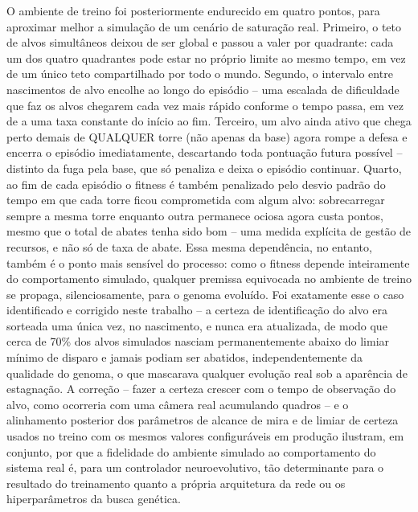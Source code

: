 \documentclass[12pt,a4paper]{article}
\begin{document}
O ambiente de treino foi posteriormente endurecido em quatro pontos, para aproximar melhor a
simulação de um cenário de saturação real. Primeiro, o teto de alvos simultâneos deixou de ser
global e passou a valer por quadrante: cada um dos quatro quadrantes
pode estar no próprio limite ao mesmo tempo, em vez de um único teto compartilhado por todo o mundo.
Segundo, o intervalo entre nascimentos de alvo encolhe ao longo do episódio -- uma escalada de
dificuldade que faz os alvos chegarem cada vez mais rápido conforme o tempo passa, em vez de a uma
taxa constante do início ao fim. Terceiro, um alvo ainda ativo que chega perto demais de QUALQUER
torre (não apenas da base) agora rompe a defesa e encerra o episódio imediatamente, descartando toda
pontuação futura possível -- distinto da fuga pela base, que só penaliza e deixa o episódio
continuar. Quarto, ao fim de cada episódio o fitness é também penalizado pelo desvio padrão do tempo
em que cada torre ficou comprometida com algum alvo: sobrecarregar sempre a mesma torre enquanto
outra permanece ociosa agora custa pontos, mesmo que o total de abates tenha sido bom -- uma medida
explícita de gestão de recursos, e não só de taxa de abate. Essa mesma dependência, no
entanto, também é o ponto mais sensível do processo: como o fitness depende inteiramente do
comportamento simulado, qualquer premissa equivocada no ambiente de treino se propaga,
silenciosamente, para o genoma evoluído. Foi exatamente esse o caso identificado e corrigido neste
trabalho -- a certeza de identificação do alvo era sorteada uma única vez, no nascimento, e nunca
era atualizada, de modo que cerca de 70\% dos alvos simulados nasciam permanentemente abaixo do
limiar mínimo de disparo e jamais podiam ser abatidos, independentemente da qualidade do genoma, o
que mascarava qualquer evolução real sob a aparência de estagnação. A correção -- fazer a certeza
crescer com o tempo de observação do alvo, como ocorreria com uma câmera real acumulando quadros --
e o alinhamento posterior dos parâmetros de alcance de mira e de limiar de certeza usados no treino
com os mesmos valores configuráveis em produção ilustram, em conjunto, por que a fidelidade do ambiente
simulado ao comportamento do sistema real é, para um controlador neuroevolutivo, tão determinante
para o resultado do treinamento quanto a própria arquitetura da rede ou os hiperparâmetros da busca
genética.
\end{document}
